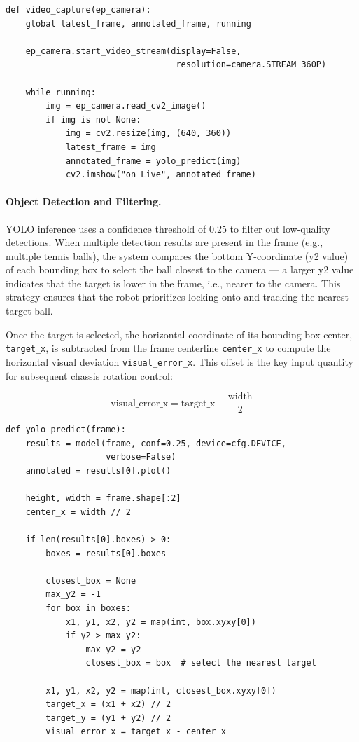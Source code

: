 \begin{verbatim}
def video_capture(ep_camera):
    global latest_frame, annotated_frame, running

    ep_camera.start_video_stream(display=False,
                                  resolution=camera.STREAM_360P)

    while running:
        img = ep_camera.read_cv2_image()
        if img is not None:
            img = cv2.resize(img, (640, 360))
            latest_frame = img
            annotated_frame = yolo_predict(img)
            cv2.imshow("on Live", annotated_frame)
\end{verbatim}

\paragraph{Object Detection and Filtering.} YOLO inference uses a confidence threshold of 0.25 to filter out low-quality detections. When multiple detection results are present in the frame (e.g., multiple tennis balls), the system compares the bottom Y-coordinate (y2 value) of each bounding box to select the ball closest to the camera — a larger y2 value indicates that the target is lower in the frame, i.e., nearer to the camera. This strategy ensures that the robot prioritizes locking onto and tracking the nearest target ball.

Once the target is selected, the horizontal coordinate of its bounding box center, \texttt{target\_x}, is subtracted from the frame centerline \texttt{center\_x} to compute the horizontal visual deviation \texttt{visual\_error\_x}. This offset is the key input quantity for subsequent chassis rotation control:

$$
\text{visual\_error\_x} = \text{target\_x} - \frac{\text{width}}{2}
$$

\begin{verbatim}
def yolo_predict(frame):
    results = model(frame, conf=0.25, device=cfg.DEVICE,
                    verbose=False)
    annotated = results[0].plot()

    height, width = frame.shape[:2]
    center_x = width // 2

    if len(results[0].boxes) > 0:
        boxes = results[0].boxes

        closest_box = None
        max_y2 = -1
        for box in boxes:
            x1, y1, x2, y2 = map(int, box.xyxy[0])
            if y2 > max_y2:
                max_y2 = y2
                closest_box = box  # select the nearest target

        x1, y1, x2, y2 = map(int, closest_box.xyxy[0])
        target_x = (x1 + x2) // 2
        target_y = (y1 + y2) // 2
        visual_error_x = target_x - center_x
\end{verbatim}

